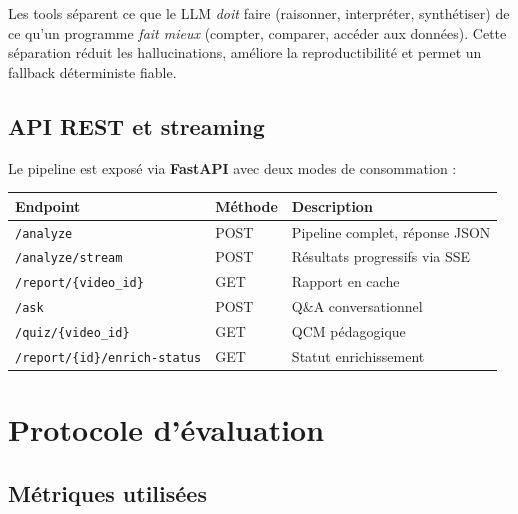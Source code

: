 \documentclass[12pt, a4paper]{article}
\begin{document}
\begin{center}
\begin{boiteinfo}[title={Avantage de l'architecture Tool Use}]
Les tools séparent ce que le LLM \textit{doit} faire (raisonner, interpréter,
synthétiser) de ce qu'un programme \textit{fait mieux} (compter, comparer,
accéder aux données). Cette séparation réduit les hallucinations, améliore
la reproductibilité et permet un fallback déterministe fiable.
\end{boiteinfo}
\end{center}

\subsection{API REST et streaming}

Le pipeline est exposé via \textbf{FastAPI} avec deux modes de consommation :

\begin{center}
\begin{tabular}{lll}
\toprule
Endpoint & Méthode & Description \\
\midrule
\texttt{/analyze}              & POST & Pipeline complet, réponse JSON \\
\texttt{/analyze/stream}       & POST & Résultats progressifs via SSE \\
\texttt{/report/\{video\_id\}} & GET  & Rapport en cache \\
\texttt{/ask}                  & POST & Q\&A conversationnel \\
\texttt{/quiz/\{video\_id\}}   & GET  & QCM pédagogique \\
\texttt{/report/\{id\}/enrich-status} & GET & Statut enrichissement \\
\bottomrule
\end{tabular}
\end{center}

\section{Protocole d'évaluation}

\subsection{Métriques utilisées}
\end{document}
